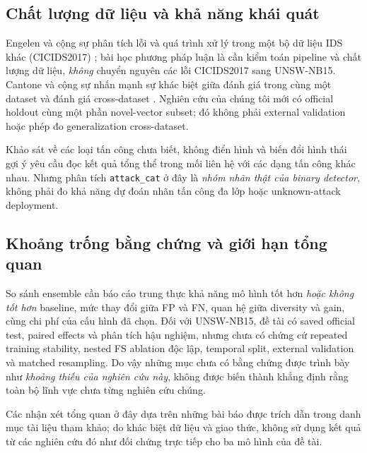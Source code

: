 \subsection{Chất lượng dữ liệu và khả năng khái quát}
Engelen và cộng sự phân tích lỗi và quá trình xử lý trong một bộ dữ liệu IDS khác (CICIDS2017) \cite{legacyL02}; bài học phương pháp luận là cần kiểm toán pipeline và chất lượng dữ liệu, \emph{không} chuyển nguyên các lỗi CICIDS2017 sang UNSW-NB15. Cantone và cộng sự nhấn mạnh sự khác biệt giữa đánh giá trong cùng một dataset và đánh giá cross-dataset \cite{legacyL09}. Nghiên cứu của chúng tôi mới có official holdout cùng một phần novel-vector subset; đó không phải external validation hoặc phép đo generalization cross-dataset.

Khảo sát về các loại tấn công chưa biết, không điển hình và biến đổi hình thái \cite{legacyL10} gợi ý yêu cầu đọc kết quả tổng thể trong mối liên hệ với các dạng tấn công khác nhau. Nhưng phân tích \texttt{attack\_cat} ở đây là \emph{nhóm nhãn thật của binary detector}, không phải đo khả năng dự đoán nhãn tấn công đa lớp hoặc unknown-attack deployment.

\subsection{Khoảng trống bằng chứng và giới hạn tổng quan}
So sánh ensemble cần báo cáo trung thực khả năng mô hình tốt hơn \emph{hoặc không tốt hơn} baseline, mức thay đổi giữa FP và FN, quan hệ giữa diversity và gain, cùng chi phí của cấu hình đã chọn. Đối với UNSW-NB15, đề tài có saved official test, paired effects và phân tích hậu nghiệm, nhưng chưa có chứng cứ repeated training stability, nested FS ablation độc lập, temporal split, external validation và matched resampling. Do vậy những mục chưa có bằng chứng được trình bày như \emph{khoảng thiếu của nghiên cứu này}, không được biến thành khẳng định rằng toàn bộ lĩnh vực chưa từng nghiên cứu chúng.

Các nhận xét tổng quan ở đây dựa trên những bài báo được trích dẫn trong danh mục tài liệu tham khảo; do khác biệt dữ liệu và giao thức, không sử dụng kết quả từ các nghiên cứu đó như đối chứng trực tiếp cho ba mô hình của đề tài.
